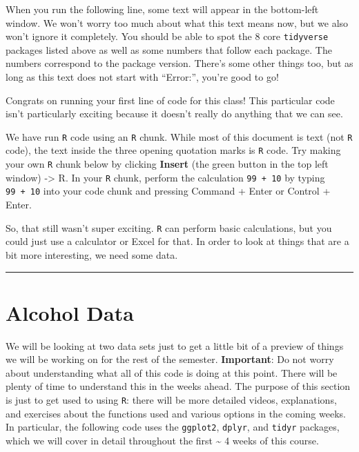 \documentclass[
]{book}
\begin{document}
When you run the following line, some text will appear in the bottom-left window. We won't worry too much about what this text means now, but we also won't ignore it completely. You should be able to spot the 8 core \texttt{tidyverse} packages listed above as well as some numbers that follow each package. The numbers correspond to the package version. There's some other things too, but as long as this text does not start with ``Error:'', you're good to go!

Congrats on running your first line of code for this class! This particular code isn't particularly exciting because it doesn't really do anything that we can see.

We have run \texttt{R} code using an \texttt{R} chunk. While most of this document is text (not \texttt{R} code), the text inside the three opening quotation marks is \texttt{R} code. Try making your own \texttt{R} chunk below by clicking \textbf{Insert} (the green button in the top left window) -\textgreater{} R. In your \texttt{R} chunk, perform the calculation \texttt{99\ +\ 10} by typing \texttt{99\ +\ 10} into your code chunk and pressing Command + Enter or Control + Enter.

So, that still wasn't super exciting. \texttt{R} can perform basic calculations, but you could just use a calculator or Excel for that. In order to look at things that are a bit more interesting, we need some data.

\begin{center}\rule{0.5\linewidth}{0.5pt}\end{center}

\hypertarget{alcohol-data}{%
\section{Alcohol Data}\label{alcohol-data}}

We will be looking at two data sets just to get a little bit of a preview of things we will be working on for the rest of the semester. \textbf{Important}: Do not worry about understanding what all of this code is doing at this point. There will be plenty of time to understand this in the weeks ahead. The purpose of this section is just to get used to using \texttt{R}: there will be more detailed videos, explanations, and exercises about the functions used and various options in the coming weeks. In particular, the following code uses the \texttt{ggplot2}, \texttt{dplyr}, and \texttt{tidyr} packages, which we will cover in detail throughout the first \textasciitilde{} 4 weeks of this course.
\end{document}
